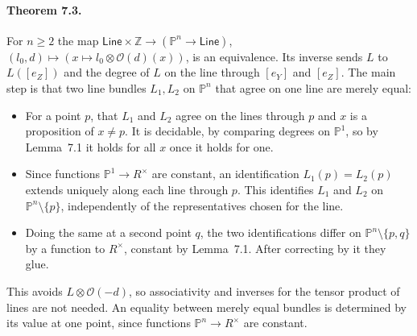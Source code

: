 \documentclass[11pt]{article}
\newcommand{\PP}{\mathbb{P}^1}
\theoremstyle{remark}
\begin{document}
\paragraph{Theorem 7.3.} For $n\ge2$ the map
$\mathsf{Line}\times\mathbb Z\to(\mathbb P^n\to\mathsf{Line})$,
$(l_0,d)\mapsto(x\mapsto l_0\otimes\mathcal O(d)(x))$, is an equivalence.
Its inverse sends $L$ to $L([e_Z])$ and the degree of $L$ on the line
through $[e_Y]$ and $[e_Z]$. The main step is that two line bundles
$L_1,L_2$ on $\mathbb P^n$ that agree on one line are merely equal:
\begin{itemize}
\item For a point $p$, that $L_1$ and $L_2$ agree on the lines through
  $p$ and $x$ is a proposition of $x\ne p$. It is decidable, by comparing
  degrees on $\PP$, so by Lemma~7.1 it holds for all $x$ once it holds for
  one.
\item Since functions $\PP\to R^\times$ are constant, an identification
  $L_1(p)=L_2(p)$ extends uniquely along each line through $p$. This
  identifies $L_1$ and $L_2$ on $\mathbb P^n\setminus\{p\}$, independently
  of the representatives chosen for the line.
\item Doing the same at a second point $q$, the two identifications
  differ on $\mathbb P^n\setminus\{p,q\}$ by a function to $R^\times$,
  constant by Lemma~7.1. After correcting by it they glue.
\end{itemize}
This avoids $L\otimes\mathcal O(-d)$, so associativity and inverses for
the tensor product of lines are not needed. An equality between merely
equal bundles is determined by its value at one point, since functions
$\mathbb P^n\to R^\times$ are constant.
\end{document}
